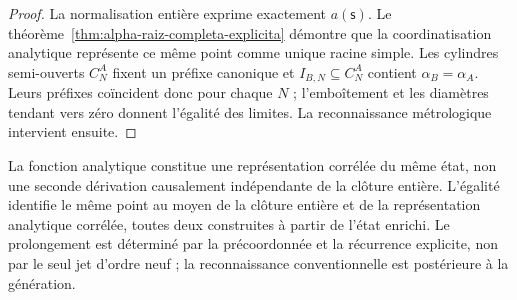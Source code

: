 \begin{proof}
La normalisation entière exprime exactement \(a(\mathsf s)\). Le
théorème~\ref{thm:alpha-raiz-completa-explicita} démontre que la coordinatisation
analytique représente ce même point comme unique racine simple. Les
cylindres semi-ouverts \(C_N^A\) fixent un préfixe canonique et
\(I_{B,N}\subseteq C_N^A\) contient \(\alpha_B=\alpha_A\). Leurs
préfixes coïncident donc pour chaque \(N\) ; l'emboîtement et les diamètres tendant vers
zéro donnent l'égalité des limites. La reconnaissance
métrologique intervient ensuite.
\end{proof}

La fonction analytique constitue une représentation corrélée du même
état, non une seconde dérivation causalement indépendante de la clôture
entière. L’égalité identifie le même point au moyen de la clôture entière
et de la représentation analytique corrélée, toutes deux construites à partir
de l’état enrichi. Le prolongement est déterminé par la
précoordonnée et la récurrence explicite, non par le seul jet d’ordre neuf ;
la reconnaissance conventionnelle est postérieure à la génération.
